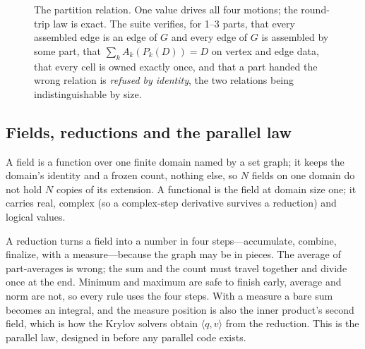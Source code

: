 \documentclass[11pt,a4paper]{article}
\begin{document}
\begin{figure}[H]
\centering
{}
\caption{The partition relation. One value drives all four motions; the round-trip law is exact. The suite verifies, for 1--3 parts, that every assembled edge is an edge of $G$ and every edge of $G$ is assembled by some part, that $\sum_k A_k(P_k(D)) = D$ on vertex and edge data, that every cell is owned exactly once, and that a part handed the wrong relation is \emph{refused by identity}, the two relations being indistinguishable by size.}
\label{fig:partition}
\end{figure}

\subsection{Fields, reductions and the parallel law}

A field is a function over one finite domain named by a set graph; it keeps the domain's identity and a frozen count, nothing else, so $N$ fields on one domain do not hold $N$ copies of its extension. A functional is the field at domain size one; it carries real, complex (so a complex-step derivative survives a reduction) and logical values.

A reduction turns a field into a number in four steps---accumulate, combine, finalize, with a measure---because the graph may be in pieces. The average of part-averages is wrong; the sum and the count must travel together and divide once at the end. Minimum and maximum are safe to finish early, average and norm are not, so every rule uses the four steps. With a measure a bare sum becomes an integral, and the measure position is also the inner product's second field, which is how the Krylov solvers obtain $\langle q, v\rangle$ from the reduction. This is the parallel law, designed in before any parallel code exists.
\end{document}
